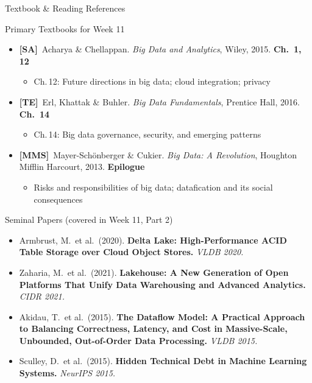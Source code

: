 \documentclass[aspectratio=169,10pt]{beamer}
\begin{document}
\begin{frame}{Textbook \& Reading References}
  \begin{block}{Primary Textbooks for Week 11}
    \begin{itemize}
      \item \textbf{[SA]}\ Acharya \& Chellappan. \textit{Big Data and Analytics}, Wiley, 2015.
            \hfill\textbf{Ch.\ 1, 12}
            \begin{itemize}
              \small\item Ch.\,12: Future directions in big data; cloud integration; privacy
            \end{itemize}
      \item \textbf{[TE]}\ Erl, Khattak \& Buhler. \textit{Big Data Fundamentals}, Prentice Hall, 2016.
            \hfill\textbf{Ch.\ 14}
            \begin{itemize}
              \small\item Ch.\,14: Big data governance, security, and emerging patterns
            \end{itemize}
      \item \textbf{[MMS]}\ Mayer-Sch\"{o}nberger \& Cukier. \textit{Big Data: A Revolution}, Houghton Mifflin Harcourt, 2013.
            \hfill\textbf{Epilogue}
            \begin{itemize}
              \small\item Risks and responsibilities of big data; datafication and its social consequences
            \end{itemize}
    \end{itemize}
  \end{block}
  \vspace{4pt}
  \begin{exampleblock}{Seminal Papers (covered in Week 11, Part 2)}
    \begin{itemize}
      \small
      \item Armbrust, M.\ et al.\ (2020). \textbf{Delta Lake: High-Performance ACID Table Storage over Cloud Object Stores.} \textit{VLDB 2020.}
      \item Zaharia, M.\ et al.\ (2021). \textbf{Lakehouse: A New Generation of Open Platforms That Unify Data Warehousing and Advanced Analytics.} \textit{CIDR 2021.}
      \item Akidau, T.\ et al.\ (2015). \textbf{The Dataflow Model: A Practical Approach to Balancing Correctness, Latency, and Cost in Massive-Scale, Unbounded, Out-of-Order Data Processing.} \textit{VLDB 2015.}
      \item Sculley, D.\ et al.\ (2015). \textbf{Hidden Technical Debt in Machine Learning Systems.} \textit{NeurIPS 2015.}
    \end{itemize}
  \end{exampleblock}
\end{frame}
\end{document}
